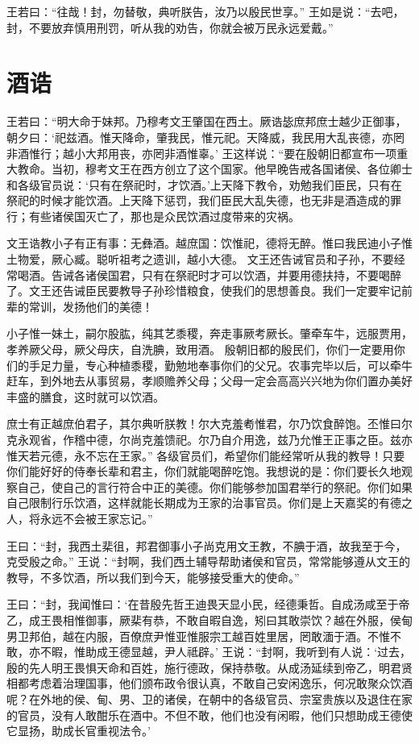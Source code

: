 \documentclass[a4paper,12pt,UTF8,twoside]{ctexbook}
\begin{document}
王若曰：“往哉！封，勿替敬，典听朕告，汝乃以殷民世享。”
王如是说：“去吧，封，不要放弃慎用刑罚，听从我的劝告，你就会被万民永远爱戴。”

\chapter{酒诰}

王若曰：“明大命于妹邦。乃穆考文王肇国在西土。厥诰毖庶邦庶士越少正御事，朝夕曰：‘祀兹酒。惟天降命，肇我民，惟元祀。天降威，我民用大乱丧德，亦罔非酒惟行；越小大邦用丧，亦罔非酒惟辜。’
王这样说：“要在殷朝旧都宣布一项重大教命。当初，穆考文王在西方创立了这个国家。他早晚告戒各国诸侯、各位卿士和各级官员说：‘只有在祭祀时，才饮酒。’上天降下教令，劝勉我们臣民，只有在祭祀的时候才能饮酒。上天降下惩罚，我们臣民大乱失德，也无非是酒造成的罪行；有些诸侯国灭亡了，那也是众民饮酒过度带来的灾祸。

文王诰教小子有正有事：无彝酒。越庶国：饮惟祀，德将无醉。惟曰我民迪小子惟土物爱，厥心臧。聪听祖考之遗训，越小大德。
文王还告诫官员和子孙，不要经常喝酒。告诫各诸侯国君，只有在祭祀时才可以饮酒，并要用德扶持，不要喝醉了。文王还告诫臣民要教导子孙珍惜粮食，使我们的思想善良。我们一定要牢记前辈的常训，发扬他们的美德！

小子惟一妹土，嗣尔股肱，纯其艺黍稷，奔走事厥考厥长。肇牵车牛，远服贾用，孝养厥父母，厥父母庆，自洗腆，致用酒。
殷朝旧都的殷民们，你们一定要用你们的手足力量，专心种植黍稷，勤勉地奉事你们的父兄。农事完毕以后，可以牵牛赶车，到外地去从事贸易，孝顺赡养父母；父母一定会高高兴兴地为你们置办美好丰盛的膳食，这时就可以饮酒。

庶士有正越庶伯君子，其尔典听朕教！尔大克羞耇惟君，尔乃饮食醉饱。丕惟曰尔克永观省，作稽中德，尔尚克羞馈祀。尔乃自介用逸，兹乃允惟王正事之臣。兹亦惟天若元德，永不忘在王家。”
各级官员们，希望你们能经常听从我的教导！只要你们能好好的侍奉长辈和君主，你们就能喝醉吃饱。我想说的是：你们要长久地观察自己，使自己的言行符合中正的美德。你们能够参加国君举行的祭祀。你们如果自己限制行乐饮酒，这样就能长期成为王家的治事官员。你们是上天嘉奖的有德之人，将永远不会被王家忘记。”

王曰：“封，我西土棐徂，邦君御事小子尚克用文王教，不腆于酒，故我至于今，克受殷之命。”
王说：“封啊，我们西土辅导帮助诸侯和官员，常常能够遵从文王的教导，不多饮酒，所以我们到今天，能够接受重大的使命。”

王曰：“封，我闻惟曰：‘在昔殷先哲王迪畏天显小民，经德秉哲。自成汤咸至于帝乙，成王畏相惟御事，厥棐有恭，不敢自暇自逸，矧曰其敢崇饮？越在外服，侯甸男卫邦伯，越在内服，百僚庶尹惟亚惟服宗工越百姓里居，罔敢湎于酒。不惟不敢，亦不暇，惟助成王德显越，尹人祗辟。’
王说：“封啊，我听到有人说：‘过去，殷的先人明王畏惧天命和百姓，施行德政，保持恭敬。从成汤延续到帝乙，明君贤相都考虑着治理国事，他们颁布政令很认真，不敢自己安闲逸乐，何况敢聚众饮酒呢？在外地的侯、甸、男、卫的诸侯，在朝中的各级官员、宗室贵族以及退住在家的官员，没有人敢酣乐在酒中。不但不敢，他们也没有闲暇，他们只想助成王德使它显扬，助成长官重视法令。’
\end{document}
